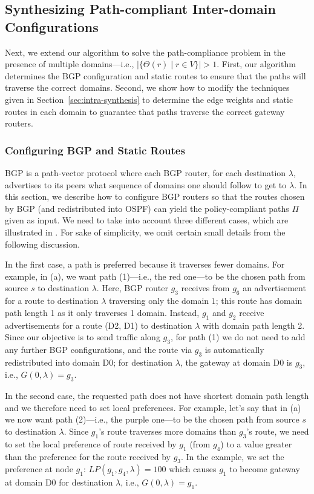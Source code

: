 \subsection{Synthesizing Path-compliant  Inter-domain Configurations}
\label{sec:inter-synthesis}

Next, we extend our algorithm to
solve the path-compliance problem in the presence
of multiple domains---i.e., $|\{\Theta(r) \mid r\in V\}|>1$.
First, our algorithm determines the 
BGP configuration and static routes to ensure that the 
paths will traverse the correct domains.
Second, we show how to modify the 
techniques given in Section~\ref{sec:intra-synthesis}
to determine the edge weights and static routes
 in each domain to guarantee that paths traverse
the correct gateway routers.


\subsubsection{Configuring BGP and Static Routes}
BGP is a path-vector protocol where each BGP router,
for each destination $\lambda$,
advertises to its peers
what sequence of domains one should follow to get to  $\lambda$.  
In this section, we describe how to configure
BGP routers so that the routes chosen by BGP 
(and redistributed into OSPF) 
can yield the policy-compliant
paths $\Pi$ given as input. 
We need to take into account three different
cases, which are illustrated in .  
For sake of simplicity, we omit certain small details 
from the following discussion.

In the first case, a path is preferred because it traverses fewer domains.
For example, in (a), we want
path (1)---i.e., the red one---to be the chosen path from source $s$ 
to destination $\lambda$.
Here, BGP router $g_3$ receives from $g_6$ an advertisement for a route to destination $\lambda$
traversing only the domain $1$; this route has domain path length 1 as it only traverses 1 domain. 
Instead, $g_1$ and $g_2$ receive advertisements for a route 
(D2, D1)
to destination $\lambda$  with 
domain path length 2. Since our objective is to send traffic along
$g_3$, for path (1) we do not need to add any further BGP configurations,
and the route via $g_3$ is automatically redistributed into domain D0;
for destination $\lambda$, the gateway at domain D0 is $g_3$, i.e.,
$G(0, \lambda) = g_3$.

In the second case, the requested path does not have shortest domain path length
and we therefore need to set local preferences.
For example, let's say that in (a) we now want
path (2)---i.e., the purple one---to be the chosen path from source $s$
to destination $\lambda$. 
Since $g_1$'s route traverses more domains than
 $g_3$'s route,
we need to set the local preference of route received by $g_1$ 
(from $g_4$) to a value greater than the preference for the route received by $g_3$. 
In the example, we set the preference at node $g_1$: 
$LP(g_1, g_4, \lambda) = 100$
which causes $g_1$ to become gateway at domain D0 for destination $\lambda$, i.e., 
$G(0, \lambda) = g_1$.

